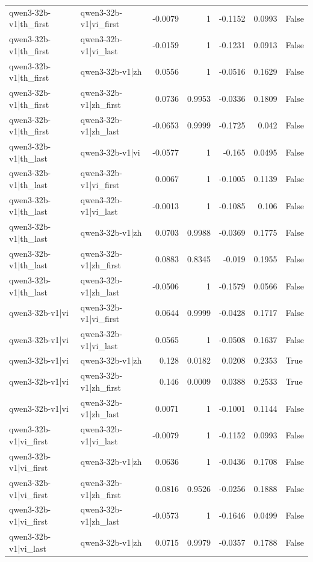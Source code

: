 \begin{table}
\begin{tabular}{l l r r r r l}
qwen3-32b-v1|th_first & qwen3-32b-v1|vi_first & -0.0079 & 1 & -0.1152 & 0.0993 & False \\
qwen3-32b-v1|th_first & qwen3-32b-v1|vi_last & -0.0159 & 1 & -0.1231 & 0.0913 & False \\
qwen3-32b-v1|th_first & qwen3-32b-v1|zh & 0.0556 & 1 & -0.0516 & 0.1629 & False \\
qwen3-32b-v1|th_first & qwen3-32b-v1|zh_first & 0.0736 & 0.9953 & -0.0336 & 0.1809 & False \\
qwen3-32b-v1|th_first & qwen3-32b-v1|zh_last & -0.0653 & 0.9999 & -0.1725 & 0.042 & False \\
qwen3-32b-v1|th_last & qwen3-32b-v1|vi & -0.0577 & 1 & -0.165 & 0.0495 & False \\
qwen3-32b-v1|th_last & qwen3-32b-v1|vi_first & 0.0067 & 1 & -0.1005 & 0.1139 & False \\
qwen3-32b-v1|th_last & qwen3-32b-v1|vi_last & -0.0013 & 1 & -0.1085 & 0.106 & False \\
qwen3-32b-v1|th_last & qwen3-32b-v1|zh & 0.0703 & 0.9988 & -0.0369 & 0.1775 & False \\
qwen3-32b-v1|th_last & qwen3-32b-v1|zh_first & 0.0883 & 0.8345 & -0.019 & 0.1955 & False \\
qwen3-32b-v1|th_last & qwen3-32b-v1|zh_last & -0.0506 & 1 & -0.1579 & 0.0566 & False \\
qwen3-32b-v1|vi & qwen3-32b-v1|vi_first & 0.0644 & 0.9999 & -0.0428 & 0.1717 & False \\
qwen3-32b-v1|vi & qwen3-32b-v1|vi_last & 0.0565 & 1 & -0.0508 & 0.1637 & False \\
qwen3-32b-v1|vi & qwen3-32b-v1|zh & 0.128 & 0.0182 & 0.0208 & 0.2353 & True \\
qwen3-32b-v1|vi & qwen3-32b-v1|zh_first & 0.146 & 0.0009 & 0.0388 & 0.2533 & True \\
qwen3-32b-v1|vi & qwen3-32b-v1|zh_last & 0.0071 & 1 & -0.1001 & 0.1144 & False \\
qwen3-32b-v1|vi_first & qwen3-32b-v1|vi_last & -0.0079 & 1 & -0.1152 & 0.0993 & False \\
qwen3-32b-v1|vi_first & qwen3-32b-v1|zh & 0.0636 & 1 & -0.0436 & 0.1708 & False \\
qwen3-32b-v1|vi_first & qwen3-32b-v1|zh_first & 0.0816 & 0.9526 & -0.0256 & 0.1888 & False \\
qwen3-32b-v1|vi_first & qwen3-32b-v1|zh_last & -0.0573 & 1 & -0.1646 & 0.0499 & False \\
qwen3-32b-v1|vi_last & qwen3-32b-v1|zh & 0.0715 & 0.9979 & -0.0357 & 0.1788 & False \\

\end{tabular}
\end{table}
